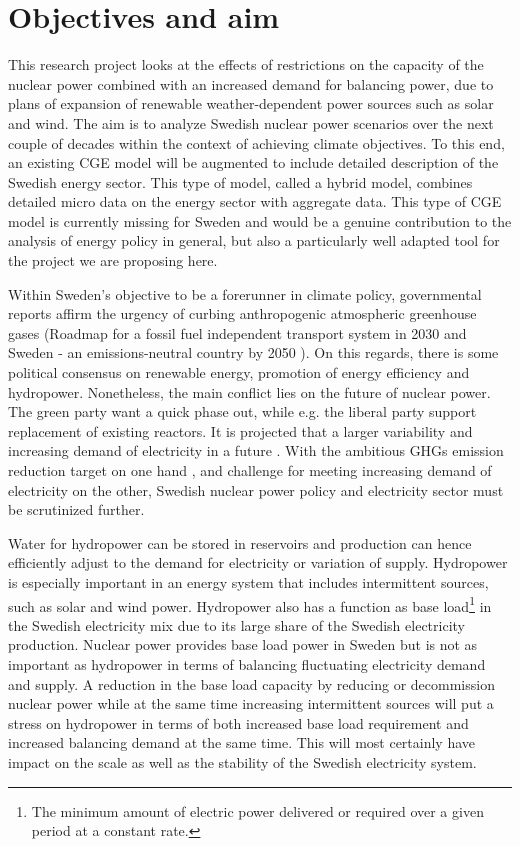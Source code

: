 \section{Objectives and aim}
This research project looks at the effects of restrictions on the capacity of the nuclear power combined with an increased demand for balancing power, due to plans of expansion of renewable weather-dependent power sources such as solar and wind. The aim is to analyze Swedish nuclear power scenarios over the next couple of decades within the context of achieving climate objectives. To this end, an existing CGE model will be augmented to include detailed description of the Swedish energy sector. This type of model, called a hybrid model, combines detailed micro data on the energy sector with aggregate data. This type of CGE model is currently missing for Sweden and would be a genuine contribution to the analysis of energy policy in general, but also a particularly well adapted tool for the project we are proposing here.

Within Sweden's objective to be a forerunner in climate policy, governmental reports affirm the urgency of curbing anthropogenic atmospheric greenhouse gases (Roadmap for a fossil fuel independent transport system in 2030 \cite{SOU201384} and Sweden - an emissions-neutral country by 2050 \cite{sepa2012}). On this regards, there is some political consensus on renewable energy, promotion of energy efficiency and hydropower. Nonetheless, the main conflict lies on the future of nuclear power. The green party want a quick phase out, while e.g. the liberal party support replacement of existing reactors. It is projected that a larger variability and increasing demand of electricity in a future \citep{sepa2012}. With the ambitious GHGs emission reduction target on one hand \citep{SOU201384}, and challenge for meeting increasing demand of electricity on the other, Swedish nuclear power policy and electricity sector must be scrutinized further.

Water for hydropower can be stored in reservoirs and production can hence efficiently adjust to the demand for electricity or variation of supply. Hydropower is especially important in an energy system that includes intermittent sources, such as solar and wind power. Hydropower also has a function as base load\footnote{The minimum amount of electric power delivered or required over a given period at a constant rate.} in the Swedish electricity mix due to its large share of the Swedish electricity production. Nuclear power provides base load power in Sweden but is not as important as hydropower in terms of balancing fluctuating electricity demand and supply. A reduction in the base load capacity by reducing or decommission nuclear power while at the same time increasing intermittent sources will put a stress on hydropower in terms of both increased base load requirement and increased balancing demand at the same time. This will most certainly have impact on the scale as well as the stability of the Swedish electricity system.

